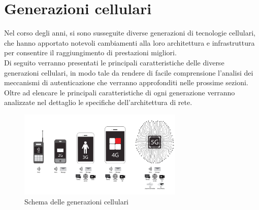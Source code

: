 \chapter{Generazioni cellulari}
Nel corso degli anni, si sono susseguite diverse generazioni di tecnologie cellulari, che hanno apportato
notevoli cambiamenti alla loro architettura e infrastruttura per consentire il raggiungimento di prestazioni migliori\cite{architecture-evolution}.\\
Di seguito verranno presentati le principali caratteristiche
delle diverse generazioni cellulari, in modo tale da rendere di facile comprensione l'analisi dei meccanismi
di autenticazione che verranno approfonditi nelle prossime sezioni.\\
Oltre ad elencare le principali caratteristiche di ogni generazione verranno analizzate nel dettaglio le specifiche  
dell'architettura di rete.
\begin{figure}[ht]
    \centering
    \includegraphics[width=0.7\textwidth]{images/generations-scheme.jpg}
    \caption{Schema delle generazioni cellulari}
\end{figure}

\clearpage

